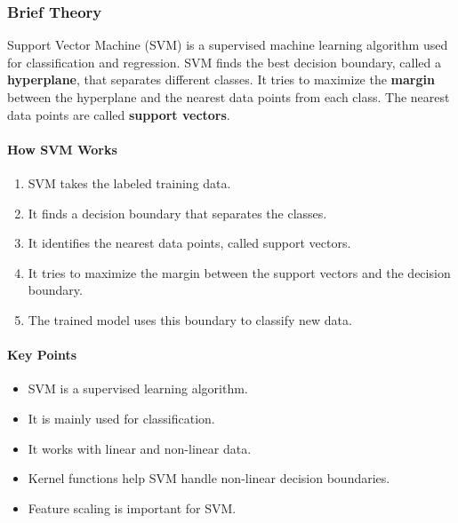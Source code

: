 \documentclass[a4paper,11pt]{article}
\begin{document}
\begin{itemize}
\subsubsection{Brief Theory}
Support Vector Machine (SVM) is a supervised machine learning algorithm used for classification and regression. SVM finds the best decision boundary, called a \textbf{hyperplane}, that separates different classes. It tries to maximize the \textbf{margin} between the hyperplane and the nearest data points from each class. The nearest data points are called \textbf{support vectors}.

\paragraph{How SVM Works}
\begin{enumerate}
    \item SVM takes the labeled training data.
    \item It finds a decision boundary that separates the classes.
    \item It identifies the nearest data points, called support vectors.
    \item It tries to maximize the margin between the support vectors and the decision boundary.
    \item The trained model uses this boundary to classify new data.
\end{enumerate}

\paragraph{Key Points}
\begin{itemize}
    \item SVM is a supervised learning algorithm.
    \item It is mainly used for classification.
    \item It works with linear and non-linear data.
    \item Kernel functions help SVM handle non-linear decision boundaries.
    \item Feature scaling is important for SVM.
\end{itemize}


\end{itemize}
\end{document}
